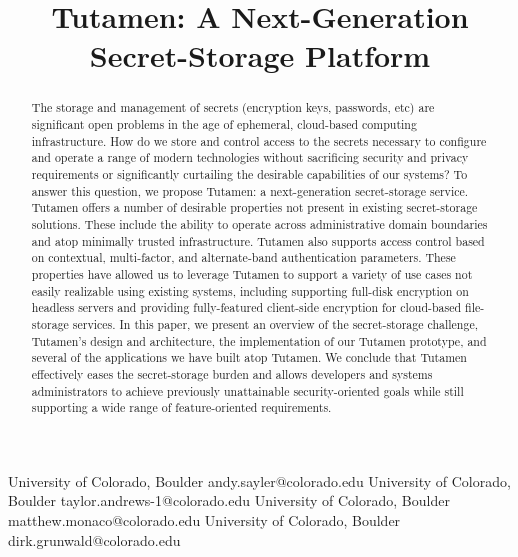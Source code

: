 \documentclass[10pt]{socc}
\begin{document}
\setlength{\pdfpageheight}{\paperheight}
\setlength{\pdfpagewidth}{\paperwidth}


\exclusivelicense

\title{Tutamen: A Next-Generation Secret-Storage Platform}

           {University of Colorado, Boulder}
           {andy.sayler@colorado.edu}
           {University of Colorado, Boulder}
           {taylor.andrews-1@colorado.edu}
           {University of Colorado, Boulder}
           {matthew.monaco@colorado.edu}
           {University of Colorado, Boulder}
           {dirk.grunwald@colorado.edu}

\maketitle

\begin{abstract}
The storage and management of secrets (encryption keys, passwords,
etc) are significant open problems in the age of ephemeral,
cloud-based computing infrastructure. How do we store and control
access to the secrets necessary to configure and operate a range of
modern technologies without sacrificing security and privacy
requirements or significantly curtailing the desirable capabilities of
our systems? To answer this question, we propose Tutamen: a
next-generation secret-storage service. Tutamen offers a number of
desirable properties not present in existing secret-storage
solutions. These include the ability to operate across administrative
domain boundaries and atop minimally trusted infrastructure. Tutamen
also supports access control based on contextual, multi-factor, and
alternate-band authentication parameters. These properties have
allowed us to leverage Tutamen to support a variety of use cases not
easily realizable using existing systems, including supporting
full-disk encryption on headless servers and providing fully-featured
client-side encryption for cloud-based file-storage services. In this
paper, we present an overview of the secret-storage challenge,
Tutamen's design and architecture, the implementation of our Tutamen
prototype, and several of the applications we have built atop
Tutamen. We conclude that Tutamen effectively eases the secret-storage
burden and allows developers and systems administrators to achieve
previously unattainable security-oriented goals while still supporting
a wide range of feature-oriented requirements.
\end{abstract}
\end{document}
